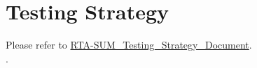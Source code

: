 \chapter{Testing Strategy}
Please refer to \href{https://confluence.etas-dev.com/display/GMSUM/Starting+Testing+Strategy+Elaboration}{RTA-SUM\_Testing\_Strategy\_Document}.
\\
.